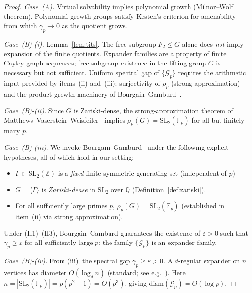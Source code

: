 \begin{proof}
  \emph{Case~(A).}
  Virtual solvability implies polynomial growth (Milnor--Wolf theorem).
  Polynomial-growth groups satisfy Kesten's criterion for amenability, from which
  $\gamma_p \to 0$ as the quotient grows.

  \emph{Case~(B)-(i).} Lemma~\ref{lem:tits}.
  The free subgroup $F_2 \leq G$ alone does \emph{not} imply expansion of the
  finite quotients.  Expander families are a property of finite Cayley-graph
  sequences; free subgroup existence in the lifting group $G$ is necessary but
  not sufficient.  Uniform spectral gap of $\{\mathcal{G}_p\}$ requires the
  arithmetic input provided by items~(ii) and~(iii): surjectivity of $\rho_p$
  (strong approximation) and the product-growth machinery of
  Bourgain--Gamburd~\cite{bourgain2008spectral}.

  \emph{Case~(B)-(ii).} Since $G$ is Zariski-dense, the strong-approximation theorem
  of Matthews--\allowbreak{}Vaserstein--\allowbreak{}Weisfeiler~\cite{matthews1984congruence}
  implies $\rho_p(G) = \mathrm{SL}_2(\mathbb{F}_p)$ for all but finitely many $p$.

  \emph{Case~(B)-(iii).}
  We invoke Bourgain--Gamburd~\cite{bourgain2008spectral} under the following
  explicit hypotheses, all of which hold in our setting:
  \begin{itemize}
    \item[(H1)] $\Gamma \subset \mathrm{SL}_2(\mathbb{Z})$ is a \emph{fixed} finite
      symmetric generating set (independent of $p$).
    \item[(H2)] $G = \langle \Gamma \rangle$ is \emph{Zariski-dense} in
      $\mathrm{SL}_2$ over $\overline{\mathbb{Q}}$ (Definition~\ref{def:zariski}).
    \item[(H3)] For all sufficiently large primes $p$,
      $\rho_p(G) = \mathrm{SL}_2(\mathbb{F}_p)$ (established in item~(ii) via
      strong approximation).
  \end{itemize}
  Under (H1)--(H3), Bourgain--Gamburd guarantees the existence of $\varepsilon > 0$
  such that $\gamma_p \geq \varepsilon$ for all sufficiently large $p$:
  the family $\{\mathcal{G}_p\}$ is an expander family.

  \emph{Case~(B)-(iv).} From (iii), the spectral gap $\gamma_p \geq \varepsilon > 0$.
  A $d$-regular expander on $n$ vertices has diameter $O(\log_d n)$
  (standard; see e.g.~\cite{lubotzky1994discrete}).
  Here $n = |\mathrm{SL}_2(\mathbb{F}_p)| = p(p^2 - 1) = O(p^3)$, giving
  $\mathrm{diam}(\mathcal{G}_p) = O(\log p)$.
\end{proof}

